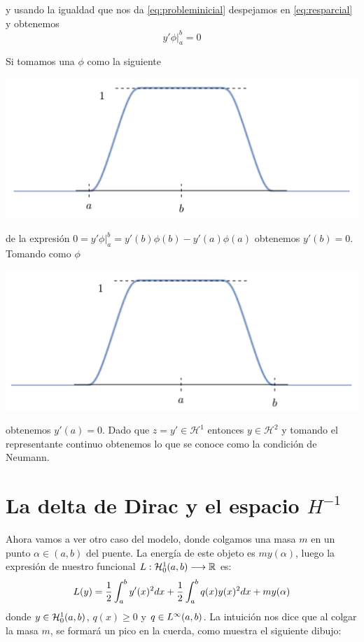 y usando la igualdad que nos da \ref{eq:probleminicial} despejamos en
\ref{eq:resparcial} y obtenemos
\[
y'\phi\Big|^b_a = 0
\]

Si tomamos una $\phi$ como la siguiente

\centerline{\includegraphics[scale=0.5]{img/caso1.png}} 

de la expresión $ 0 = y'\phi\Big|^b_a = y'(b)\phi(b)-y'(a)\phi(a)$
obtenemos $y'(b) = 0$. Tomando como $\phi$

\centerline{\includegraphics[scale=0.5]{img/caso2.png}} 

obtenemos $y'(a) = 0$. Dado que $z=y'\in \mathcal{H}^1$ entonces $y\in \mathcal{H}^2$ y
tomando el representante continuo obtenemos lo que se conoce como la condición de Neumann.

\section{La delta de Dirac y el espacio $H^{-1}$}

Ahora vamos a ver otro caso del modelo, donde colgamos una masa $m$ en un punto $\alpha\in(a,b)$ del puente. La energía de este objeto es $my(\alpha)$, luego la expresión de nuestro funcional $L : \mathcal{H}_0^{ 1 } (a,b) \longrightarrow \mathbb{R}$ es:
\[
L(y)=\frac{1}{2}\displaystyle\int_{ a }^{ b } y'(x)^2dx+\frac{1}{2}\displaystyle\int_{ a }^{ b } q(x)y(x)^2dx+my(\alpha)
\]
donde $y\in\mathcal{H}_0^{ 1 } (a,b)$, $q(x)\geq 0$ y  $q\in L^{ \infty }(a,b)$. La intuición nos dice que al colgar la masa $m$, se formará un pico en la cuerda, como muestra el siguiente dibujo:

